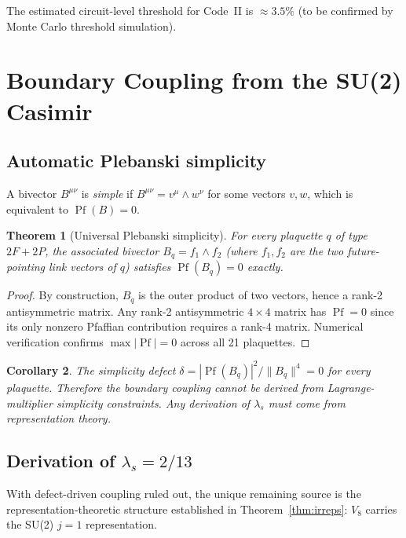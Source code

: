 \documentclass[12pt,a4paper]{article}
\theoremstyle{plain}
\newtheorem{theorem}{Theorem}[section]
\newtheorem{corollary}[theorem]{Corollary}
\theoremstyle{definition}
\newcommand{\lams}{\lambda_s}
\DeclareMathOperator{\Pf}{Pf}
\begin{document}
The estimated circuit-level threshold for Code~II is $\approx 3.5\%$
(to be confirmed by Monte Carlo threshold simulation).

\section{Boundary Coupling from the SU(2) Casimir}
\label{sec:coupling}

\subsection{Automatic Plebanski simplicity}

A bivector $B^{\mu\nu}$ is \emph{simple} if $B^{\mu\nu} = v^\mu \wedge w^\nu$
for some vectors $v, w$, which is equivalent to $\Pf(B) = 0$.

\begin{theorem}[Universal Plebanski simplicity]
\label{thm:plebanski}
  For every plaquette $q$ of type $2F+2P$, the associated bivector
  $B_q = f_1 \wedge f_2$ (where $f_1, f_2$ are the two future-pointing
  link vectors of $q$) satisfies $\Pf(B_q) = 0$ exactly.
\end{theorem}

\begin{proof}
  By construction, $B_q$ is the outer product of two vectors, hence
  a rank-2 antisymmetric matrix.  Any rank-2 antisymmetric $4\times4$
  matrix has $\Pf = 0$ since its only nonzero Pfaffian contribution
  requires a rank-4 matrix.  Numerical verification confirms $\max|\Pf| = 0$
  across all 21 plaquettes.
\end{proof}

\begin{corollary}
  The simplicity defect $\delta = |\Pf(B_q)|^2 / \|B_q\|^4 = 0$
  for every plaquette.  Therefore the boundary coupling cannot be
  derived from Lagrange-multiplier simplicity constraints.
  Any derivation of $\lams$ must come from representation theory.
\end{corollary}

\subsection{Derivation of $\lams = 2/13$}

With defect-driven coupling ruled out, the unique remaining source is
the representation-theoretic structure established in
Theorem~\ref{thm:irreps}: $V_8$ carries the SU(2) $j=1$ representation.
\end{document}
